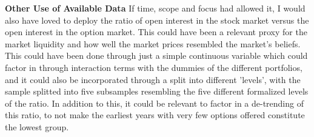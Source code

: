 \textbf{Other Use of Available Data} If time, scope and focus had allowed it, I would also have loved to deploy the ratio of open interest in the stock market versus the open interest in the option market. This could have been a relevant proxy for the market liquidity and how well the market prices resembled the market's beliefs. This could have been done through just a simple continuous variable which could factor in through interaction terms with the dummies of the different portfolios, and it could also be incorporated through a split into different 'levels', with the sample splitted into five subsamples resembling the five different formalized levels of the ratio. In addition to this, it could be relevant to factor in a de-trending of this ratio, to not make the earliest years with very few options offered constitute the lowest group. 
